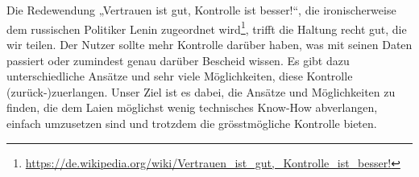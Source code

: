 \\
\\
Die Redewendung „Vertrauen ist gut, Kontrolle ist besser!“, die ironischerweise dem russischen Politiker Lenin zugeordnet wird\footnote{\url{https://de.wikipedia.org/wiki/Vertrauen_ist_gut,_Kontrolle_ist_besser!}}, trifft die Haltung recht gut, die wir teilen. Der Nutzer sollte mehr Kontrolle darüber haben, was mit seinen Daten passiert oder zumindest genau darüber Bescheid wissen. Es gibt dazu unterschiedliche Ansätze und sehr viele Möglichkeiten, diese Kontrolle (zurück-)zuerlangen. Unser Ziel ist es dabei, die Ansätze und Möglichkeiten zu finden, die dem Laien möglichst wenig technisches Know-How abverlangen, einfach umzusetzen sind und trotzdem die grösstmögliche Kontrolle bieten.

